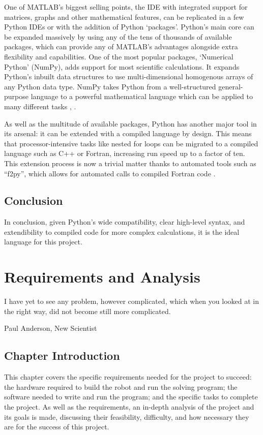 \documentclass{report}
\begin{document}
    One of MATLAB’s biggest selling points, the IDE with integrated support for matrices, graphs and other mathematical features, can be replicated in a few Python IDEs or with the addition of Python ‘packages’. Python’s main core can be expanded massively by using any of the tens of thousands of available packages, which can provide any of MATLAB’s advantages alongside extra flexibility and capabilities. One of the most popular packages, ‘Numerical Python’ (NumPy), adds support for most scientific calculations. It expands Python’s inbuilt data structures to use multi-dimensional homogenous arrays of any Python data type. NumPy takes Python from a well-structured general-purpose language to a powerful mathematical language which can be applied to many different tasks \cite{Cai2005}, \cite{Oliphant2006}.
    
    As well as the multitude of available packages, Python has another major tool in its arsenal: it can be extended with a compiled language by design. This means that processor-intensive tasks like nested for loops can be migrated to a compiled language such as C++ or Fortran, increasing run speed up to a factor of ten. This extension process is now a trivial matter thanks to automated tools such as \enquote{f2py}, which allows for automated calls to compiled Fortran code \cite{Oliphant2006}.
    
    \section{Conclusion}
    In conclusion, given Python’s wide compatibility, clear high-level syntax, and extendibility to compiled code for more complex calculations, it is the ideal language for this project.
   
    \newpage
    \chapter{Requirements and Analysis}
    \epigraph{I have yet to see any problem, however complicated, which when you looked at in the right way, did not become still more complicated.}{Paul Anderson, New Scientist \cite{Anderson1969}}
    
    \section{Chapter Introduction} %
    This chapter covers the specific requirements needed for the project to succeed: the hardware required to build the robot and run the solving program; the software needed to write and run the program; and the specific tasks to complete the project. As well as the requirements, an in-depth analysis of the project and its goals is made, discussing their feasibility, difficulty, and how necessary they are for the success of this project.
    
\end{document}
